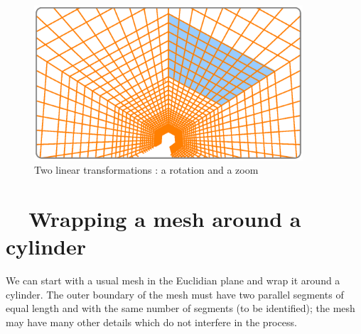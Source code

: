 \begin{figure}[ht] \centering
  \includegraphics[width=100mm]{sector-3.eps}
  \caption{Two linear transformations : a rotation and a zoom}
  \label{\numb section 7.\numb fig 9}
\end{figure}


\section{~~Wrapping a mesh around a cylinder}\label{\numb section 7.\numb parag 14}

We can start with a usual mesh in the Euclidian plane and wrap it around a cylinder.
The outer boundary of the mesh must have two parallel segments of equal length and with
the same number of segments (to be identified); the mesh may have many other details
which do not interfere in the process.

